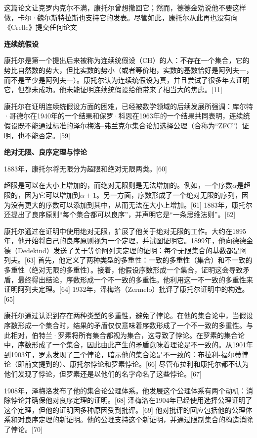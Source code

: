 这篇论文让克罗内克尔不满，康托尔曾想撤回它；然而，德德金劝说他不要这样做，卡尔·魏尔斯特拉斯也支持它的发表。尽管如此，康托尔从此再也没有向《Crelle》提交任何论文

\textbf{连续统假设}

康托尔是第一个提出后来被称为连续统假设（CH）的人：不存在一个集合，它的势比自然数的势大，但比实数的势小（或者等价地，实数的基数恰好是阿列夫一，而不是至少是阿列夫一）。康托尔认为连续统假设为真，并且尝试了很多年去证明它，但都未成功。他未能证明连续统假设给他带来了相当大的焦虑。[11]

康托尔在证明连续统假设方面的困难，已经被数学领域的后续发展所强调：库尔特·哥德尔在1940年的一个结果和保罗·科恩在1963年的一个结果共同表明，连续统假设既不能通过标准的泽尔梅洛–弗兰克尔集合论加选择公理（合称为“ZFC”）证明，也不能否定。[59]

\textbf{绝对无限、良序定理与悖论}

1883年，康托尔将无限分为超限和绝对无限两类。[60]

超限是可以在大小上增加的，而绝对无限则是无法增加的。例如，一个序数\(\alpha\)是超限的，因为它可以增加到\(\alpha+1\)。另一方面，序数形成了一个绝对无限的序列，因为没有更大的序数可以添加到其中，从而无法在大小上增加。[61] 1883年，康托尔还提出了良序原则“每个集合都可以良序”，并声明它是“一条思维法则”。[62]

康托尔通过在证明中使用绝对无限，扩展了他关于绝对无限的工作。大约在1895年，他开始将自己的良序原则视为一个定理，并试图证明它。1899年，他向德德金德（Dedekind）发送了关于等价阿列夫定理的证明：每个无限集合的基数都是阿列夫。[63] 首先，他定义了两种类型的多重性：一致的多重性（集合）和不一致的多重性（绝对无限的多重性）。接着，他假设序数形成一个集合，证明这会导致矛盾，最终得出结论，序数形成一个不一致的多重性。他利用这一不一致的多重性来证明阿列夫定理。[64] 1932年，泽梅洛（Zermelo）批评了康托尔证明中的构造。[65]

康托尔通过认识到存在两种类型的多重性，避免了悖论。在他的集合论中，当假设序数形成一个集合时，结果的矛盾仅仅意味着序数形成了一个不一致的多重性。与此相对，伯特兰·罗素将所有集合都视为集合，这导致了悖论。在罗素的集合论中，序数形成了一个集合，因此由此产生的矛盾意味着理论是不一致的。从1901年到1903年，罗素发现了三个悖论，暗示他的集合论是不一致的：布拉利-福尔蒂悖论（即前文提到的）、康托尔悖论和罗素悖论。[66] 尽管布拉利和康托尔都不认为他们发现了悖论，但罗素还是以他们的名字命名了这些悖论。[67]

1908年，泽梅洛发布了他的集合论公理体系。他发展这个公理体系有两个动机：消除悖论并确保他对良序定理的证明。[68] 泽梅洛在1904年已经使用选择公理证明了这个定理，但他的证明因多种原因受到批评。[69] 他对批评的回应包括他的公理体系和对良序定理的新证明。他的公理支持这个新证明，并通过限制集合的构造消除了悖论。[70]

